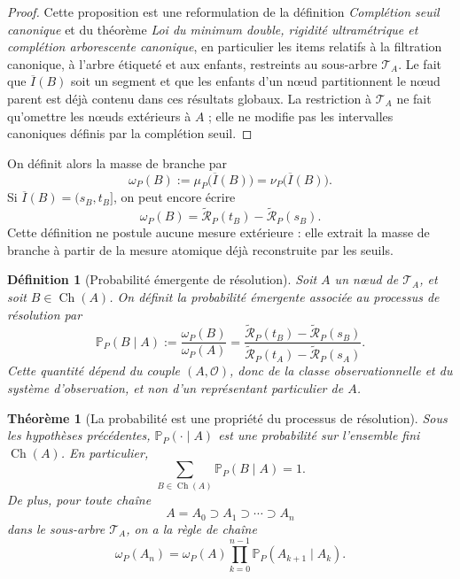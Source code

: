 \documentclass[11pt,a4paper]{article}
\newtheorem{definition}{Définition}
\newtheorem{theorem}{Théorème}
\begin{document}
\begin{appendices}
\begin{proof}
Cette proposition est une reformulation de la définition \emph{Complétion seuil canonique} et du théorème \emph{Loi du minimum double, rigidité ultramétrique et complétion arborescente canonique}, en particulier les items relatifs à la filtration canonique, à l'arbre étiqueté et aux enfants, restreints au sous-arbre \(\mathcal T_A\). Le fait que \(\overline I(B)\) soit un segment et que les enfants d'un nœud partitionnent le nœud parent est déjà contenu dans ces résultats globaux. La restriction à \(\mathcal T_A\) ne fait qu'omettre les nœuds extérieurs à \(A\) ; elle ne modifie pas les intervalles canoniques définis par la complétion seuil.
\end{proof}

On définit alors la masse de branche par
\[
\omega_P(B):=\mu_P\bigl(\overline I(B)\bigr)=\nu_P\bigl(\overline I(B)\bigr).
\]
Si \(\overline I(B)=(s_B,t_B]\), on peut encore écrire
\[
\omega_P(B)=\widetilde{\mathcal R}_P(t_B)-\widetilde{\mathcal R}_P(s_B).
\]
Cette définition ne postule aucune mesure extérieure : elle extrait la masse de branche à partir de la mesure atomique déjà reconstruite par les seuils.

\begin{definition}[Probabilité émergente de résolution]
Soit \(A\) un nœud de \(\mathcal T_A\), et soit \(B\in\operatorname{Ch}(A)\). On définit la probabilité émergente associée au processus de résolution par
\[
\mathbb P_P(B\mid A):=\frac{\omega_P(B)}{\omega_P(A)}
=
\frac{\widetilde{\mathcal R}_P(t_B)-\widetilde{\mathcal R}_P(s_B)}
{\widetilde{\mathcal R}_P(t_A)-\widetilde{\mathcal R}_P(s_A)}.
\]
Cette quantité dépend du couple \((A,\mathcal O)\), donc de la classe observationnelle et du système d'observation, et non d'un représentant particulier de \(A\).
\end{definition}

\begin{theorem}[La probabilité est une propriété du processus de résolution]
Sous les hypothèses précédentes, \(\mathbb P_P(\cdot\mid A)\) est une probabilité sur l'ensemble fini \(\operatorname{Ch}(A)\). En particulier,
\[
\sum_{B\in\operatorname{Ch}(A)}\mathbb P_P(B\mid A)=1.
\]
De plus, pour toute chaîne
\[
A=A_0\supset A_1\supset \cdots \supset A_n
\]
dans le sous-arbre \(\mathcal T_A\), on a la règle de chaîne
\[
\omega_P(A_n)
=
\omega_P(A)\prod_{k=0}^{n-1}\mathbb P_P(A_{k+1}\mid A_k).
\]
\end{theorem}


\end{appendices}
\end{document}
